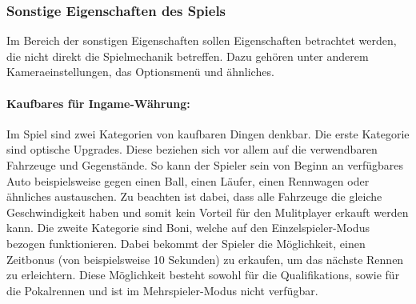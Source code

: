 	\subsubsection{Sonstige Eigenschaften des Spiels}
	Im Bereich der sonstigen Eigenschaften sollen Eigenschaften betrachtet werden, die nicht direkt die Spielmechanik betreffen. Dazu gehören unter anderem Kameraeinstellungen, das Optionsmenü und ähnliches.

		\paragraph{Kaufbares für Ingame-Währung:}
		Im Spiel sind zwei Kategorien von kaufbaren Dingen denkbar. Die erste Kategorie sind optische Upgrades. Diese beziehen sich vor allem auf die verwendbaren Fahrzeuge und Gegenstände. So kann der Spieler sein von Beginn an verfügbares Auto beispielsweise gegen einen Ball, einen Läufer, einen Rennwagen oder ähnliches austauschen. Zu beachten ist dabei, dass alle Fahrzeuge die gleiche Geschwindigkeit haben und somit kein Vorteil für den Mulitplayer erkauft werden kann. Die zweite Kategorie sind Boni, welche auf den Einzelspieler-Modus bezogen funktionieren. Dabei bekommt der Spieler die Möglichkeit, einen Zeitbonus (von beispielsweise 10 Sekunden) zu erkaufen, um das nächste Rennen zu erleichtern. Diese Möglichkeit besteht sowohl für die Qualifikations, sowie für die Pokalrennen und ist im Mehrspieler-Modus nicht verfügbar.

